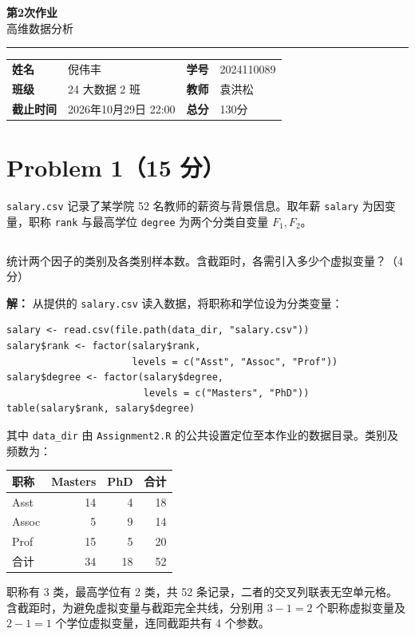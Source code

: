 \documentclass[12pt,a4paper]{article}
\newcommand{\course}{高维数据分析}
\newcommand{\homeworktitle}{第2次作业}
\newcommand{\studentname}{倪伟丰}
\newcommand{\studentid}{2024110089}
\newcommand{\classname}{24 大数据 2 班}
\newcommand{\teacher}{袁洪松}
\newcommand{\duedate}{2026年10月29日 22:00}
\newcommand{\totalpoints}{130}
\begin{document}
\begin{center}
  {\Huge\bfseries\color{mainblue}\homeworktitle}\\[0.6em]
  {\Large\course}\\[1.2em]
  {\color{linegray}\rule{0.9\textwidth}{0.8pt}}
\end{center}

\begin{infobox}
\begin{tabularx}{\linewidth}{>{\bfseries}p{2.2cm} X >{\bfseries}p{2.2cm} X}
姓名 & \studentname & 学号 & \studentid \\
班级 & \classname & 教师 & \teacher \\
截止时间 & \duedate & 总分 & \totalpoints 分
\end{tabularx}
\end{infobox}

\section{Problem 1（15 分）}

\texttt{salary.csv} 记录了某学院 52 名教师的薪资与背景信息。取年薪 \texttt{salary} 为因变量，职称 \texttt{rank} 与最高学位 \texttt{degree} 为两个分类自变量 $F_1,F_2$。

\subsection{}

统计两个因子的类别及各类别样本数。含截距时，各需引入多少个虚拟变量？（4 分）

\begin{answerbox}
\textbf{解：}
从提供的 \texttt{salary.csv} 读入数据，将职称和学位设为分类变量：
\begin{lstlisting}[style=rcode]
salary <- read.csv(file.path(data_dir, "salary.csv"))
salary$rank <- factor(salary$rank,
                      levels = c("Asst", "Assoc", "Prof"))
salary$degree <- factor(salary$degree,
                        levels = c("Masters", "PhD"))
table(salary$rank, salary$degree)
\end{lstlisting}
其中 \texttt{data\_dir} 由 \texttt{Assignment2.R} 的公共设置定位至本作业的数据目录。类别及频数为：
\begin{center}
\begin{tabular}{lrrr}
\toprule
职称 & Masters & PhD & 合计 \\
\midrule
Asst & 14 & 4 & 18 \\
Assoc & 5 & 9 & 14 \\
Prof & 15 & 5 & 20 \\
\midrule
合计 & 34 & 18 & 52 \\
\bottomrule
\end{tabular}
\end{center}
职称有 3 类，最高学位有 2 类，共 52 条记录，二者的交叉列联表无空单元格。
含截距时，为避免虚拟变量与截距完全共线，分别用 $3-1=2$ 个职称虚拟变量及 $2-1=1$ 个学位虚拟变量，连同截距共有 4 个参数。

\end{answerbox}
\end{document}
